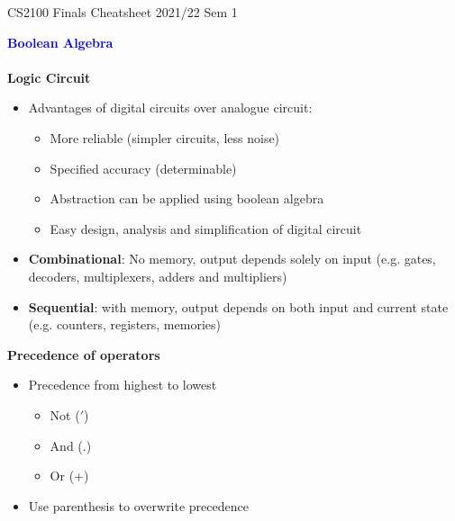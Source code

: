 \documentclass[a4paper]{article} \usepackage[backend=biber, style=numeric, sorting=none]{biblatex}
\begin{document}
\setlength\parindent{0pt}
\scriptsize
{}

\begin{center}
{\large CS2100 Finals Cheatsheet 2021/22 Sem 1}
\end{center}
    \begin{multicols*}{4}

{\small\textbf{\textcolor{blue}{Boolean Algebra}}}
\\\\\textbf{Logic Circuit}
\begin{itemize}
\item Advantages of digital circuits over analogue circuit:
    \begin{itemize}
        \item More reliable (simpler circuits, less noise)
        \item Specified accuracy (determinable)
        \item Abstraction can be applied using boolean algebra
        \item Easy design, analysis and simplification of digital circuit
    \end{itemize}
\item \textbf{Combinational}: No memory, output depends solely on input (e.g. gates, decoders, multiplexers, adders and multipliers)
\item \textbf{Sequential}: with memory, output depends on both input and current state (e.g. counters, registers, memories)\\
\end{itemize}

\textbf{Precedence of operators}
\begin{itemize}
\item Precedence from highest to lowest
    \begin{itemize}
        \item Not ($'$)
        \item And ($.$)
        \item Or (+)
    \end{itemize}
\item Use parenthesis to overwrite precedence\\
\end{itemize}


\end{multicols*}
\end{document}
